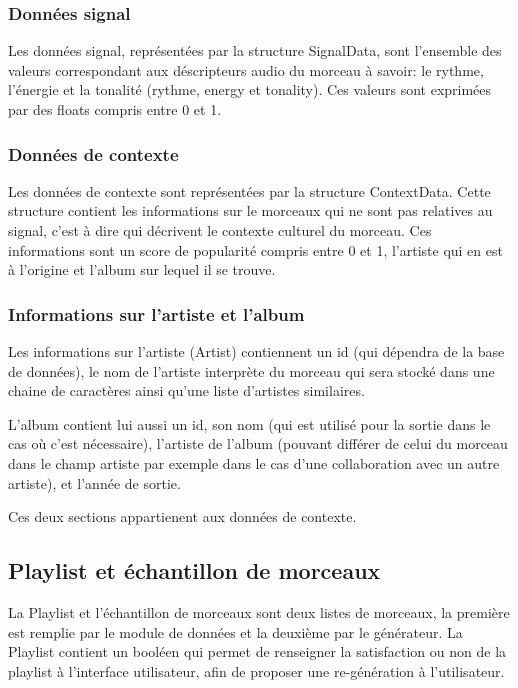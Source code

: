 \subsubsection{Données signal}
\label{archi:structures:morceau:signal}

Les données signal, représentées par la structure SignalData, sont l'ensemble 
des valeurs correspondant aux déscripteurs audio du morceau à savoir: le rythme, 
l'énergie et la tonalité (rythme, energy et tonality). Ces valeurs sont 
exprimées par des floats compris entre 0 et 1.

\subsubsection{Données de contexte}
\label{archi:structures:morceau:contexte}

Les données de contexte sont représentées par la structure ContextData. Cette 
structure contient les informations sur le morceaux qui ne sont pas relatives 
au signal, c'est à dire qui décrivent le contexte culturel du morceau. Ces 
informations sont un score de popularité compris entre 0 et 1, l'artiste qui 
en est à l'origine et l'album sur lequel il se trouve.

\subsubsection{Informations sur l'artiste et l'album}
\label{archi:structures:morceau:artiste}

Les informations sur l'artiste (Artist) contiennent un id (qui dépendra de la 
base de données), le nom de l'artiste interprète du morceau qui sera stocké dans 
une chaine de caractères ainsi qu'une liste d'artistes similaires.

L'album contient lui aussi un id, son nom (qui est utilisé pour la sortie dans 
le cas où c'est nécessaire), l'artiste de l'album (pouvant différer de celui du 
morceau dans le champ artiste par exemple dans le cas d'une collaboration avec 
un autre artiste), et l'année de sortie.

Ces deux sections appartienent aux données de contexte.

\subsection{Playlist et échantillon de morceaux}
\label{archi:structures:playlist}

La Playlist et l'échantillon de morceaux sont deux listes de morceaux, la 
première est remplie par le module de données et la deuxième par le générateur. 
La Playlist contient un booléen qui permet de renseigner la satisfaction ou non 
de la playlist à l'interface utilisateur, afin de proposer une re-génération à 
l'utilisateur.

